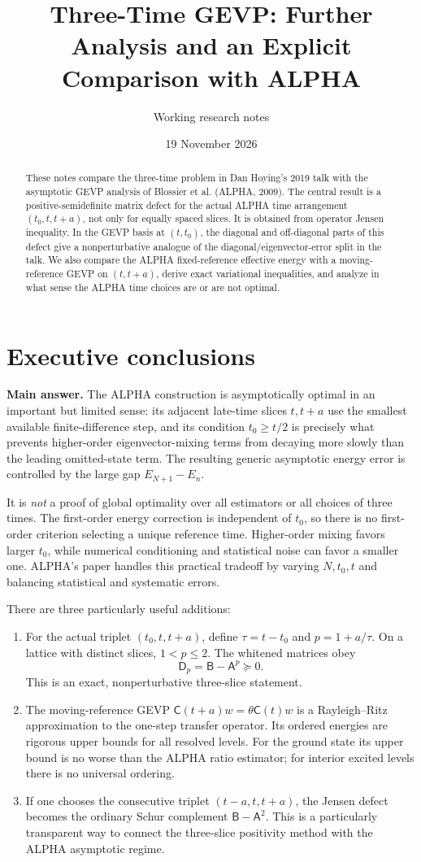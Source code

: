 \documentclass[11pt]{article}
\title{Three-Time GEVP: Further Analysis and an Explicit Comparison with ALPHA}
\author{Working research notes}
\date{19 November 2026}
\newcommand{\C}{\mathsf C}
\newcommand{\A}{\mathsf A}
\newcommand{\B}{\mathsf B}
\newcommand{\D}{\mathsf D}
\begin{document}
\maketitle
\begin{abstract}
These notes compare the three-time problem in Dan Hoying's 2019 talk with the asymptotic GEVP analysis of Blossier et al. (ALPHA, 2009). The central result is a positive-semidefinite matrix defect for the actual ALPHA time arrangement $(t_0,t,t+a)$, not only for equally spaced slices. It is obtained from operator Jensen inequality. In the GEVP basis at $(t,t_0)$, the diagonal and off-diagonal parts of this defect give a nonperturbative analogue of the diagonal/eigenvector-error split in the talk. We also compare the ALPHA fixed-reference effective energy with a moving-reference GEVP on $(t,t+a)$, derive exact variational inequalities, and analyze in what sense the ALPHA time choices are or are not optimal.
\end{abstract}

\section{Executive conclusions}
\textbf{Main answer.} The ALPHA construction is asymptotically optimal in an important but limited sense: its adjacent late-time slices $t,t+a$ use the smallest available finite-difference step, and its condition $t_0\geq t/2$ is precisely what prevents higher-order eigenvector-mixing terms from decaying more slowly than the leading omitted-state term. The resulting generic asymptotic energy error is controlled by the large gap $E_{N+1}-E_n$.

It is \emph{not} a proof of global optimality over all estimators or all choices of three times. The first-order energy correction is independent of $t_0$, so there is no first-order criterion selecting a unique reference time. Higher-order mixing favors larger $t_0$, while numerical conditioning and statistical noise can favor a smaller one. ALPHA's paper handles this practical tradeoff by varying $N,t_0,t$ and balancing statistical and systematic errors.

There are three particularly useful additions:
\begin{enumerate}
\item For the actual triplet $(t_0,t,t+a)$, define $\tau=t-t_0$ and $p=1+a/\tau$. On a lattice with distinct slices, $1<p\leq2$. The whitened matrices obey
\[
\boxed{\D_p=\B-\A^p\succeq0.}
\]
This is an exact, nonperturbative three-slice statement.
\item The moving-reference GEVP $\C(t+a)w=\theta\C(t)w$ is a Rayleigh--Ritz approximation to the one-step transfer operator. Its ordered energies are rigorous upper bounds for all resolved levels. For the ground state its upper bound is no worse than the ALPHA ratio estimator; for interior excited levels there is no universal ordering.
\item If one chooses the consecutive triplet $(t-a,t,t+a)$, the Jensen defect becomes the ordinary Schur complement $\B-\A^2$. This is a particularly transparent way to connect the three-slice positivity method with the ALPHA asymptotic regime.
\end{enumerate}
\end{document}
